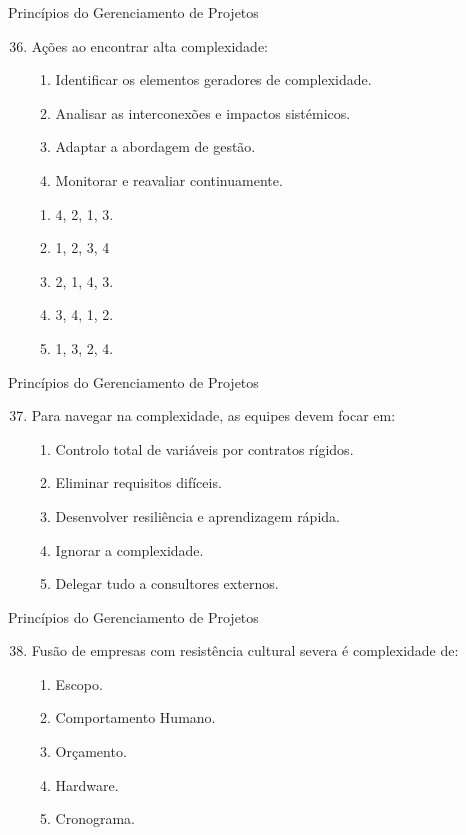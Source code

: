 \documentclass{beamer}
\begin{document}
\begin{frame}{Princípios do Gerenciamento de Projetos}
	\begin{enumerate}
		\setcounter{enumi}{35}
		\justifying
		\item Ações ao encontrar alta complexidade:
		\begin{enumerate}[I]
			\item Identificar os elementos geradores de complexidade.
			\item Analisar as interconexões e impactos sistémicos.
			\item Adaptar a abordagem de gestão.
			\item Monitorar e reavaliar continuamente.
		\end{enumerate}
		\begin{enumerate}[a]
			\item 4, 2, 1, 3.
			\item \alert<2>{1, 2, 3, 4}
			\item 2, 1, 4, 3.
			\item 3, 4, 1, 2.
			\item 1, 3, 2, 4.
		\end{enumerate}
	\end{enumerate}
\end{frame}

\begin{frame}{Princípios do Gerenciamento de Projetos}
	\begin{enumerate}
		\setcounter{enumi}{36}
		\justifying
		\item Para navegar na complexidade, as equipes devem focar em:
		\begin{enumerate}[a]
			\item Controlo total de variáveis por contratos rígidos.
			\item Eliminar requisitos difíceis.
			\item \alert<2>{Desenvolver resiliência e aprendizagem rápida.}
			\item Ignorar a complexidade.
			\item Delegar tudo a consultores externos.
		\end{enumerate}
	\end{enumerate}
\end{frame}

\begin{frame}{Princípios do Gerenciamento de Projetos}
	\begin{enumerate}
		\setcounter{enumi}{37}
		\justifying
		\item Fusão de empresas com resistência cultural severa é complexidade de:
		\begin{enumerate}[a]
			\item Escopo.
			\item \alert<2>{Comportamento Humano.}
			\item Orçamento.
			\item Hardware.
			\item Cronograma.
		\end{enumerate}
	\end{enumerate}
\end{frame}
\end{document}
